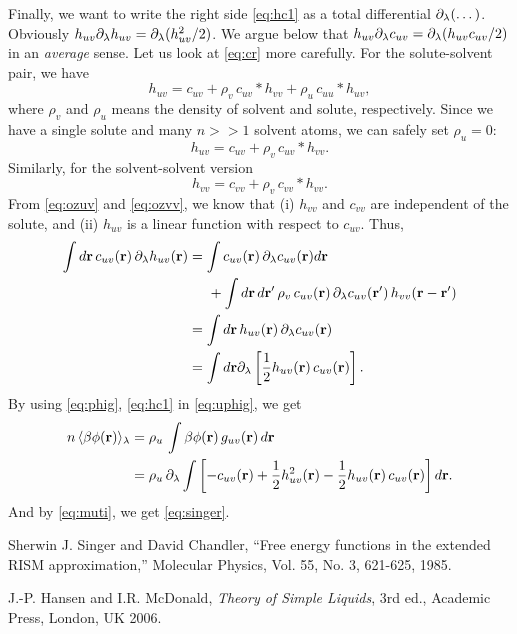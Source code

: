 \documentclass[10pt]{article}
\begin{document}
Finally, we want to write the right side \eqref{eq:hc1} as
a total differential $\partial_\lambda(\dots)$.
%
Obviously $h_{uv} \partial_\lambda h_{uv} = \partial_\lambda ( h_{uv}^2/2 )$.
%
We argue below that $h_{uv} \partial_\lambda c_{uv} = \partial_\lambda ( h_{uv} c_{uv} /2) $
in an \emph{average} sense.
Let us look at \eqref{eq:cr} more carefully.
%
For the solute-solvent pair, we have
\[
  h_{uv} = c_{uv} + \rho_v \, c_{uv}*h_{vv}
  + \rho_u \, c_{uu}*h_{uv},
\]
where $\rho_v$ and $\rho_u$ means the density of
solvent and solute, respectively.
%
Since we have a single solute and many $n >> 1$ solvent atoms,
we can safely set $\rho_u = 0$:
\begin{equation}
  h_{uv} = c_{uv} + \rho_v \, c_{uv}*h_{vv}.
  \label{eq:ozuv}
\end{equation}
Similarly, for the solvent-solvent version
\begin{equation}
  h_{vv} = c_{vv} + \rho_v \, c_{vv}*h_{vv}.
  \label{eq:ozvv}
\end{equation}
From \eqref{eq:ozuv} and \eqref{eq:ozvv}, we know that
  (i) $h_{vv}$ and $c_{vv}$ are independent of the solute,
  and
  (ii) $h_{uv}$ is a linear function with respect to $c_{uv}$.
%
Thus,
\begin{align}
  \int d\mathbf{r} \, c_{uv}(\mathbf{r}) \, \partial_\lambda h_{uv}(\mathbf{r})
  &=
  \int c_{uv}(\mathbf{r}) \, \partial_\lambda c_{uv}(\mathbf{r}) d\mathbf{r} \notag \\
  & \;\;\;\;\;
    +
    \int d\mathbf{r} \, d\mathbf{r}'
    \, \rho_v
    \, c_{uv}(\mathbf{r})
    \, \partial_\lambda c_{uv}(\mathbf{r}') \, h_{vv}(\mathbf{r} - \mathbf{r}') \notag \\
  &= \int d\mathbf{r} \, h_{uv}(\mathbf{r}) \, \partial_\lambda c_{uv}(\mathbf{r}) \notag \\
  &= \int d\mathbf{r} \partial_\lambda
    \left[
      \frac{1}{2} h_{uv}(\mathbf{r}) \,  c_{uv}(\mathbf{r})
    \right].
  \label{eq:phig}
\end{align}
%
By using \eqref{eq:phig}, \eqref{eq:hc1} in \eqref{eq:uphig}, we get
%
\begin{align*}
  n \,
  \langle
  \beta \phi(\mathbf{r})
  \rangle_\lambda
  &=
  \rho_u \, \int \beta \phi(\mathbf{r}) \, g_{uv}(\mathbf{r}) \, d \mathbf{r} \\
  &=
   \rho_u \, \partial_\lambda \int \left[
    - c_{uv}(\mathbf{r})
    + \frac{1}{2} h_{uv}^2(\mathbf{r})
    - \frac{1}{2} h_{uv}(\mathbf{r}) \, c_{uv}(\mathbf{r})
    \right] d \mathbf{r}.
  \end{align*}
And by \eqref{eq:muti}, we get \eqref{eq:singer}.



\begin{thebibliography}{100}

  Sherwin J. Singer and David Chandler,
  ``Free energy functions in the extended RISM approximation,''
  Molecular Physics, Vol. 55, No. 3, 621-625,
  1985.

  J.-P. Hansen and I.R. McDonald,
  {\it Theory of Simple Liquids}, 3rd ed.,
  Academic Press, London, UK 2006.

\end{thebibliography}
\end{document}
